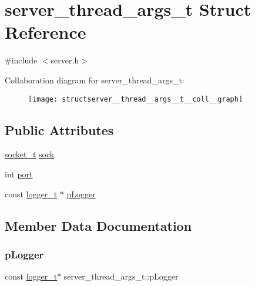 \hypertarget{structserver__thread__args__t}{}\section{server\+\_\+thread\+\_\+args\+\_\+t Struct Reference}
\label{structserver__thread__args__t}


{\ttfamily \#include $<$server.\+h$>$}



Collaboration diagram for server\+\_\+thread\+\_\+args\+\_\+t\+:
\nopagebreak
\begin{figure}[H]
\begin{center}
\leavevmode
\texttt{[image: structserver\_\_thread\_\_args\_\_t\_\_coll\_\_graph]}
\end{center}
\end{figure}
\subsection*{Public Attributes}
\begin{DoxyCompactItemize}
\item 
\hyperlink{datatypes_8h_a30353f381f5fccbb956eea1f3a110b6c}{socket\+\_\+t} \hyperlink{structserver__thread__args__t_afcaca013fc84d1969ccb28c907ccff77}{sock}
\item 
int \hyperlink{structserver__thread__args__t_a0bf51eeb92c580aad89b8492cdb7c9bd}{port}
\item 
const \hyperlink{structlogger__t}{logger\+\_\+t} $\ast$ \hyperlink{structserver__thread__args__t_ad7c9b5025d97f79a8fbf390b9e340501}{p\+Logger}
\end{DoxyCompactItemize}


\subsection{Member Data Documentation}
\mbox{\label{structserver__thread__args__t_ad7c9b5025d97f79a8fbf390b9e340501}} 
\subsubsection{\texorpdfstring{p\+Logger}{pLogger}}
{\footnotesize\ttfamily const \hyperlink{structlogger__t}{logger\+\_\+t}$\ast$ server\+\_\+thread\+\_\+args\+\_\+t\+::p\+Logger}

